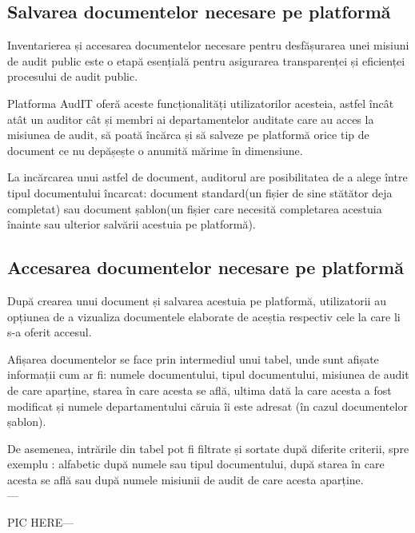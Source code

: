 \subsection{Salvarea documentelor necesare pe platformă}

Inventarierea și accesarea documentelor necesare pentru desfășurarea unei misiuni de audit public este o etapă esențială pentru asigurarea transparenței și eficienței procesului de audit public.

Platforma AudIT oferă aceste funcționalități utilizatorilor acesteia, astfel încât atât un auditor cât și membri ai departamentelor auditate care au acces la misiunea de audit, să poată încărca și să salveze pe platformă orice tip de document ce nu depășește o anumită mărime în dimensiune.

La incărcarea unui astfel de document, auditorul are posibilitatea de a alege între tipul documentului încarcat: document standard(un fișier de sine stătător deja completat) sau document șablon(un fișier care necesită completarea acestuia înainte sau ulterior salvării acestuia pe platformă).






 \subsection{Accesarea documentelor necesare pe platformă}
 
 După crearea unui document și salvarea acestuia pe platformă, utilizatorii au opțiunea de a vizualiza documentele elaborate de aceștia respectiv cele la care li s-a oferit accesul.
 
 Afișarea documentelor se face prin intermediul unui tabel, unde sunt afișate informații cum ar fi: numele documentului, tipul documentului, misiunea de audit de care aparține, starea în care acesta se află, ultima dată la care acesta a fost modificat și numele departamentului căruia îi este adresat (în cazul documentelor șablon).
 
 De asemenea, intrările din tabel pot fi filtrate și sortate după diferite criterii, spre exemplu : alfabetic după numele sau tipul documentului, după starea în care acesta se află sau după numele misiunii de audit de care acesta aparține.\\
 
 ---
 
 
 
 
  PIC HERE---\\
 
